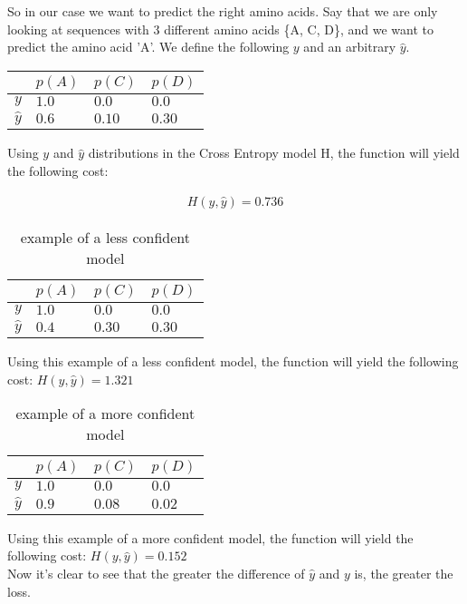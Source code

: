 \noindent
So in our case we want to predict the right amino acids. Say that we are only looking at sequences with 3 different amino acids \{A, C, D\}, and we want to predict the amino acid 'A'. We define the following $y$ and an arbitrary $\hat{y}$.

\begin{table}[h]
\centering
\begin{tabular}{|l|l|l|l|}
\hline
           & $p(A)$ & $p(C)$ & $p(D)$ \\ \hline
$y$       & $1.0$  & $0.0$  & $0.0 $ \\ \hline
$\hat{y}$ & $0.6$  & $0.10$ & $0.30$ \\ \hline
\end{tabular}
\end{table}

\noindent
Using $y$ and $\hat{y}$ distributions in the Cross Entropy model H, the function will yield the following cost:

\begin{align}
    H(y,\hat{y}) = 0.736
\end{align}

\begin{table}[h]
\centering
\begin{tabular}{|l|l|l|l|}
\hline
          & $p(A)$ & $p(C)$ & $p(D)$ \\ \hline
$y$       & $1.0$  & $0.0$  & $0.0 $ \\ \hline
$\hat{y}$ & $0.4$  & $0.30$ & $0.30$ \\ \hline
\end{tabular}
\caption{example of a less confident model}\label{Baseline:before}
\end{table}

\noindent
Using this example of a less confident model, the function will yield the following cost: $H(y,\hat{y}) = 1.321$\\

\begin{table}[h]
\centering
\begin{tabular}{|l|l|l|l|}
\hline
          & $p(A)$ & $p(C)$ & $p(D)$ \\ \hline
$y$       & $1.0$  & $0.0$  & $0.0 $ \\ \hline
$\hat{y}$ & $0.9$  & $0.08$ & $0.02$ \\ \hline
\end{tabular}
\caption{example of a more confident model}\label{Baseline:before}
\end{table}

\noindent
Using this example of a more confident model, the function will yield the following cost: $H(y,\hat{y}) = 0.152$\\

\noindent
Now it's clear to see that the greater the difference of $\hat{y}$ and $y$ is, the greater the loss.